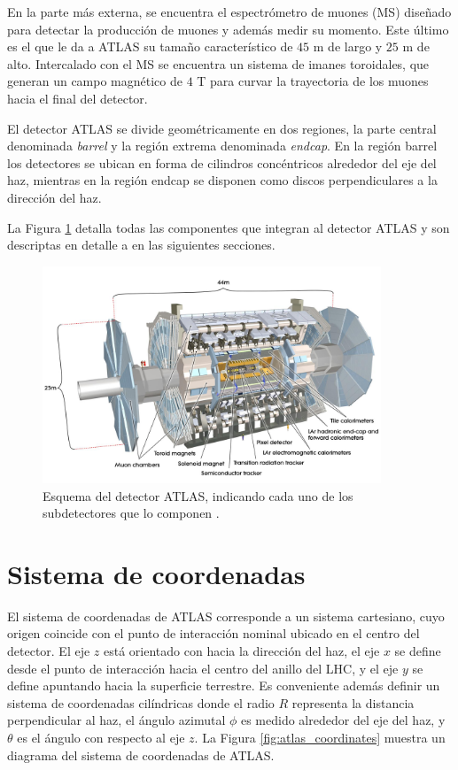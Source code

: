 En la parte más externa, se encuentra el espectrómetro de muones (MS) diseñado para detectar la producción de muones y además medir su momento. Este último es el que le da a ATLAS su tamaño característico de $45$ m de largo y $25$ m de alto. Intercalado con el MS se encuentra un sistema de imanes toroidales, que generan un campo magnético de $4$ T para curvar la trayectoria de los muones hacia el final del detector.

El detector ATLAS se divide geométricamente en dos regiones, la parte central denominada \textit{barrel} y la región extrema denominada \textit{endcap}. En la región barrel los detectores se ubican en forma de cilindros concéntricos alrededor del eje del haz, mientras en la región endcap se disponen como discos perpendiculares a la dirección del haz. 

La Figura \ref{fig:atlas_1} detalla todas las componentes que integran al detector ATLAS y son descriptas en detalle a en las siguientes secciones.

\begin{figure}
\centering
  \includegraphics[width=0.9\textwidth]{images/lhc/atlas_1.jpg}
  \caption{Esquema del detector ATLAS, indicando cada uno de los subdetectores que lo componen \cite{Pequenao:1095924}.}
  \label{fig:atlas_1}
\end{figure}

\section{Sistema de coordenadas}

El sistema de coordenadas de ATLAS corresponde a un sistema cartesiano, cuyo origen coincide con el punto de interacción nominal ubicado en el centro del detector. El eje $z$ está orientado con hacia la dirección del haz, el eje $x$ se define desde el punto de interacción hacia el centro del anillo del LHC, y el eje $y$ se define apuntando hacia la superficie terrestre. Es conveniente además definir un sistema de coordenadas cilíndricas donde el radio $R$ representa la distancia perpendicular al haz, el ángulo azimutal $\phi$ es medido alrededor del eje del haz, y $\theta$ es el ángulo con respecto al eje $z$. La Figura \ref{fig:atlas_coordinates} muestra un diagrama del sistema de coordenadas de ATLAS.

